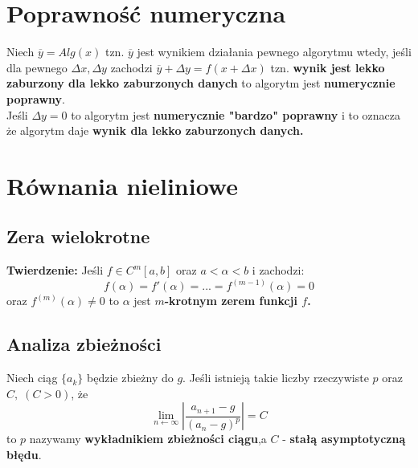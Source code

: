 \documentclass{article}
\begin{document}
\begin{minipage}[t]{.325\textwidth}
\section*{Poprawność numeryczna}
Niech $\overline{y} = Alg(x)$ tzn. $\overline{y}$ jest wynikiem działania pewnego algorytmu wtedy, jeśli dla pewnego $\Delta x,\Delta y$ zachodzi $\overline{y} + \Delta y = f(x + \Delta x)$ tzn. \textbf{wynik jest lekko zaburzony dla lekko zaburzonych danych } to algorytm jest \color{red}\textbf{numerycznie poprawny}\color{black}.\\
Jeśli $\Delta y = 0$ to algorytm jest \color{red} \textbf{numerycznie "bardzo"\: poprawny\:}\color{black} i to oznacza że
algorytm daje \textbf{wynik dla lekko zaburzonych danych.}
\section*{Równania nieliniowe}
\subsection*{Zera wielokrotne}
\textbf{Twierdzenie:\;} Jeśli $f \in C^m[a,b]$ oraz $a < \alpha < b$ i zachodzi:
\begin{equation*}
    f(\alpha) = f'(\alpha) = ... = f^{(m-1)}(\alpha) = 0
\end{equation*}
oraz $f^{(m)}(\alpha) \neq 0$ to $\alpha$ jest \color{red}\textbf{$m$-krotnym zerem funkcji $f$.}\color{black}
\subsection*{Analiza zbieżności}
Niech ciąg $\{a_k\}$ będzie zbieżny do $g$. Jeśli istnieją takie liczby rzeczywiste $p$ oraz $C,\;(C > 0)$, że 
\begin{equation*}
    \lim_{n \leftarrow \infty} \left|\frac{a_{n+1} - g}{(a_n - g)^p}\right| = C
\end{equation*}
to $p$ nazywamy \color{red}\textbf{wykładnikiem zbieżności ciągu},\color{black}\;a $C$ - \color{red}\textbf{stałą asymptotyczną błędu}\color{black}.

\end{minipage}
\end{document}
